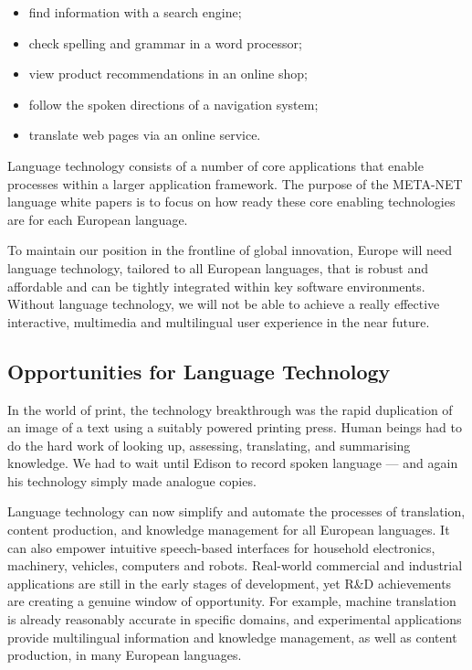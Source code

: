 \begin{multicols}{2}
\begin{itemize}
\item find information with a search engine;
\item check spelling and grammar in a word processor;
\item view product recommendations in an online shop;
\item follow the spoken directions of a navigation system;
\item translate web pages via an online service.
\end{itemize}

Language technology consists of a number of core applications that enable processes within a larger application framework. The purpose of the META-NET language white papers is to focus on how ready these core enabling technologies are for each European language. 


To maintain our position in the frontline of global innovation, Europe will need language technology, tailored to all European languages, that is robust and affordable and can be tightly integrated within key software environments. Without language technology, we will not be able to achieve a really effective interactive, multimedia and multilingual user experience in the near future.

\subsection{Opportunities for Language Technology}

In the world of print, the technology breakthrough was the rapid duplication of an image of a text using a suitably powered printing press. Human beings had to do the hard work of looking up, assessing, translating, and summarising knowledge. We had to wait until Edison to record spoken language --- and again his technology simply made analogue copies.

Language technology can now simplify and automate the processes of translation, content production, and knowledge management for all European languages. It can also empower intuitive speech-based interfaces for household electronics, machinery, vehicles, computers and robots. Real-world commercial and industrial applications are still in the early stages of development, yet R\&D achievements are creating a genuine window of opportunity. For example, machine translation is already reasonably accurate in specific domains, and experimental applications provide multilingual information and knowledge management, as well as content production, in many European languages. 


\end{multicols}
